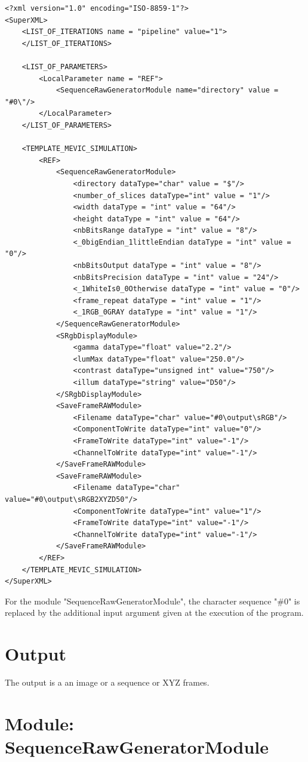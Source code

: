 \lstset{language=XML}
\begin{lstlisting}
<?xml version="1.0" encoding="ISO-8859-1"?>
<SuperXML>
	<LIST_OF_ITERATIONS name = "pipeline" value="1">	
	</LIST_OF_ITERATIONS>
	
	<LIST_OF_PARAMETERS>
		<LocalParameter name = "REF">
			<SequenceRawGeneratorModule name="directory" value = "#0\"/>
		</LocalParameter>				
	</LIST_OF_PARAMETERS>

	<TEMPLATE_MEVIC_SIMULATION>
		<REF>
			<SequenceRawGeneratorModule>
				<directory dataType="char" value = "$"/>
				<number_of_slices dataType="int" value = "1"/>
				<width dataType = "int" value = "64"/>
				<height dataType = "int" value = "64"/>
				<nbBitsRange dataType = "int" value = "8"/>
				<_0bigEndian_1littleEndian dataType = "int" value = "0"/>
				<nbBitsOutput dataType = "int" value = "8"/>
				<nbBitsPrecision dataType = "int" value = "24"/>
				<_1WhiteIs0_0Otherwise dataType = "int" value = "0"/>
				<frame_repeat dataType = "int" value = "1"/>
				<_1RGB_0GRAY dataType = "int" value = "1"/>			
			</SequenceRawGeneratorModule>
			<SRgbDisplayModule>
				<gamma dataType="float" value="2.2"/>
				<lumMax dataType="float" value="250.0"/>
				<contrast dataType="unsigned int" value="750"/>
				<illum dataType="string" value="D50"/>
			</SRgbDisplayModule>
			<SaveFrameRAWModule>
				<Filename dataType="char" value="#0\output\sRGB"/>
				<ComponentToWrite dataType="int" value="0"/>
				<FrameToWrite dataType="int" value="-1"/>
				<ChannelToWrite dataType="int" value="-1"/>
			</SaveFrameRAWModule>			
			<SaveFrameRAWModule>
				<Filename dataType="char" value="#0\output\sRGB2XYZD50"/>
				<ComponentToWrite dataType="int" value="1"/>
				<FrameToWrite dataType="int" value="-1"/>
				<ChannelToWrite dataType="int" value="-1"/>
			</SaveFrameRAWModule>			
		</REF>	
	</TEMPLATE_MEVIC_SIMULATION>
</SuperXML>
\end{lstlisting}

For the module "SequenceRawGeneratorModule", the character sequence "$\#0$" is replaced by the additional input argument given at the execution of the program. 

\section{Output}

The output is a an image or a sequence or XYZ frames.

\section{Module: SequenceRawGeneratorModule}

